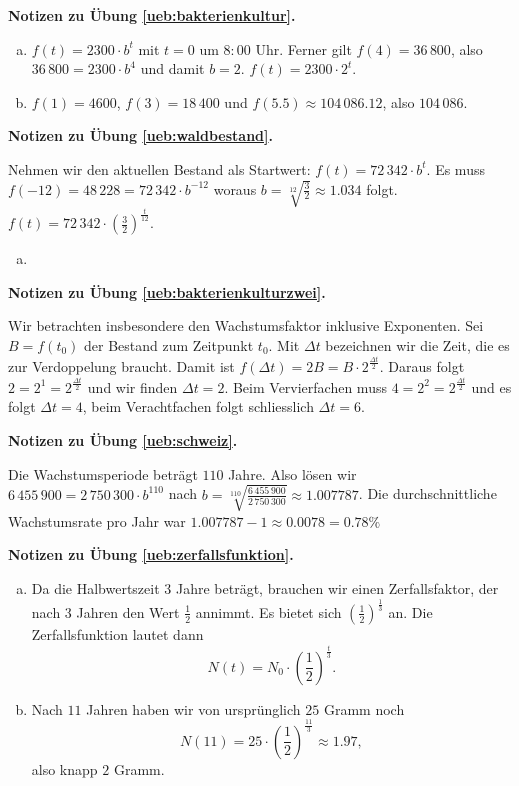 \documentclass[%
11pt,%
twoside,%
titlepage,%
swissgerman,%
headsepline%
]{scrartcl}
\newcommand{\faReturnGray}{\textcolor{gray}{\faMailReply}} %
\theoremstyle{definition}
\theoremstyle{plain}
\newcommand{\concatueb}[1]{ueb:#1}%
\newcommand{\concatlsg}[1]{lsg:#1}%
\newenvironment{lsg}[1]{%
    \par\noindent\textbf{Notizen zu Übung \ref{\concatueb{#1}}.}%
    \label{\concatlsg{#1}} %
    \hfill\hyperref[\concatueb{#1}]{\faReturnGray}\par %
}{%
    \par%
}
\begin{document}
\begin{lsg}{bakterienkultur}
    \begin{enumerate}[a)]
        \item $f(t)=2300\cdot b^t$ mit $t=0$ um $8:00$ Uhr. Ferner gilt $f(4)=36\,800$, also $36\,800=2300\cdot b^4$ und damit $b=2$. $f(t)=2300\cdot2^t$.
        \item $f(1)=4600$, $f(3)=18\,400$ und $f(5.5)\approx104\,086.12$, also $104\,086$.
    \end{enumerate}
\end{lsg}

\begin{lsg}{waldbestand}
    Nehmen wir den aktuellen Bestand als Startwert: $f(t)=72\,342\cdot b^t$. Es muss $f(-12)=48\,228=72\,342\cdot b^{-12}$ woraus $b=\sqrt[12]{\frac{3}{2}}\approx1.034$ folgt. $f(t)=72\,342\cdot\left(\frac{3}{2}\right)^{\frac{t}{12}}$.
    \begin{enumerate}[a)]
        \item 
    \end{enumerate}
\end{lsg}

\begin{lsg}{bakterienkulturzwei}
    Wir betrachten insbesondere den Wachstumsfaktor inklusive Exponenten. Sei $B=f(t_0)$ der Bestand zum Zeitpunkt $t_0$. Mit $\Delta t$ bezeichnen wir die Zeit, die es zur Verdoppelung braucht. Damit ist $f(\Delta t)=2B=B\cdot2^\frac{\Delta t}{2}$. Daraus folgt $2=2^1=2^\frac{\Delta t}{2}$ und wir finden $\Delta t=2$. Beim Vervierfachen muss $4=2^2=2^\frac{\Delta t}{2}$ und es folgt $\Delta t=4$, beim Verachtfachen folgt schliesslich $\Delta t=6$.
\end{lsg}

\begin{lsg}{schweiz}
    Die Wachstumsperiode beträgt $110$ Jahre. Also lösen wir $6\,455\,900=2\,750\,300\cdot b^{110}$ nach $b=\sqrt[110]{\frac{6\,455\,900}{2\,750\,300}}\approx1.007787$. Die durchschnittliche Wachstumsrate pro Jahr war $1.007787-1\approx0.0078=0.78\%$
\end{lsg}

\begin{lsg}{zerfallsfunktion}
    \begin{enumerate}[a)]
        \item Da die Halbwertszeit $3$ Jahre beträgt, brauchen wir einen Zerfallsfaktor, der nach $3$ Jahren den Wert $\frac{1}{2}$ annimmt. Es bietet sich $(\frac{1}{2})^{\frac{1}{3}}$ an. Die Zerfallsfunktion lautet dann
        $$N(t)=N_0\cdot(\frac{1}{2})^{\frac{t}{3}}.$$
        \item Nach $11$ Jahren haben wir von ursprünglich $25$ Gramm noch
        $$N(11)=25\cdot(\frac{1}{2})^{\frac{11}{3}}\approx1.97,$$
        also knapp $2$ Gramm.
    \end{enumerate}
\end{lsg}
\end{document}
